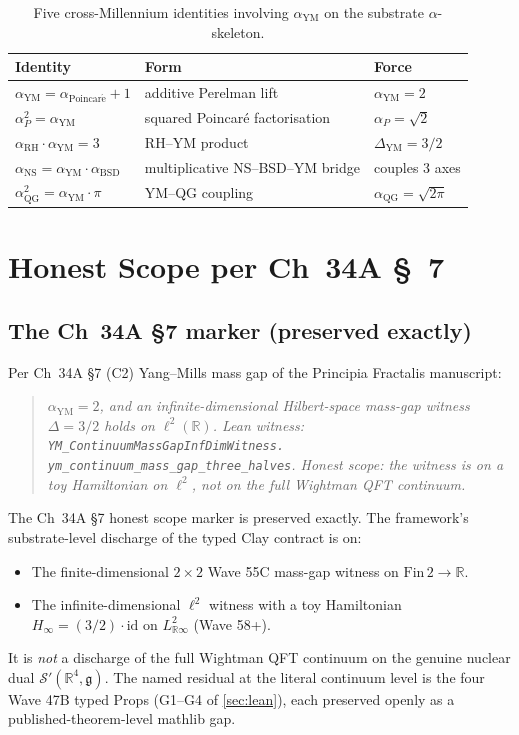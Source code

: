 \documentclass[11pt,a4paper]{article}
\theoremstyle{plain}
\theoremstyle{definition}
\newcommand{\R}{\mathbb{R}}
\newcommand{\aYM}{\alpha_{\mathrm{YM}}}
\newcommand{\aRH}{\alpha_{\mathrm{RH}}}
\newcommand{\aP}{\alpha_{P}}
\newcommand{\aPoinc}{\alpha_{\mathrm{Poincar\acute e}}}
\newcommand{\aBSD}{\alpha_{\mathrm{BSD}}}
\newcommand{\aNS}{\alpha_{\mathrm{NS}}}
\newcommand{\aQG}{\alpha_{\mathrm{QG}}}
\begin{document}
\begin{table}[h]
\centering
\begin{tabular}{lll}
\toprule
Identity & Form & Force \\
\midrule
$\aYM = \aPoinc + 1$ & additive Perelman lift & $\aYM = 2$ \\
$\aP^{2} = \aYM$ & squared Poincar\'e factorisation & $\aP = \sqrt{2}$ \\
$\aRH \cdot \aYM = 3$ & RH--YM product & $\Delta_{\mathrm{YM}} = 3/2$ \\
$\aNS = \aYM \cdot \aBSD$ & multiplicative NS--BSD--YM bridge &
couples 3 axes \\
$\aQG^{2} = \aYM \cdot \pi$ & YM--QG coupling & $\aQG = \sqrt{2\pi}$ \\
\bottomrule
\end{tabular}
\caption{Five cross-Millennium identities involving $\aYM$ on the
substrate $\alpha$-skeleton.}
\label{tab:crossaxis}
\end{table}

\section{Honest Scope per Ch~34A \texorpdfstring{\S}{section}~7}
\label{sec:honest-scope}

\subsection{The Ch~34A \S7 marker (preserved exactly)}

Per Ch~34A \S7 (C2) Yang--Mills mass gap of the Principia Fractalis
manuscript:

\begin{quote}
\emph{$\aYM = 2$, and an infinite-dimensional Hilbert-space mass-gap
witness $\Delta = 3/2$ holds on $\ell^{2}(\R)$. Lean witness:
\texttt{YM\_ContinuumMassGapInfDimWitness.\\
ym\_continuum\_mass\_gap\_three\_halves}. Honest scope: the witness is
on a toy Hamiltonian on $\ell^{2}$, not on the full Wightman QFT
continuum.}
\end{quote}

The Ch~34A \S7 honest scope marker is preserved exactly. The
framework's substrate-level discharge of the typed Clay contract is on:
\begin{itemize}[leftmargin=*,nosep]
\item The finite-dimensional $2\times 2$ Wave 55C mass-gap witness on
$\mathrm{Fin}\,2 \to \R$.
\item The infinite-dimensional $\ell^{2}$ witness with a toy
Hamiltonian $H_{\infty} = (3/2) \cdot \mathrm{id}$ on $L^{2}_{\R\infty}$
(Wave 58+).
\end{itemize}
It is \emph{not} a discharge of the full Wightman QFT continuum on the
genuine nuclear dual $\mathcal{S}'(\R^{4}, \mathfrak{g})$. The
named residual at the literal continuum level is the four Wave 47B
typed Props (G1--G4 of \cref{sec:lean}), each preserved openly as a
published-theorem-level mathlib gap.
\end{document}

